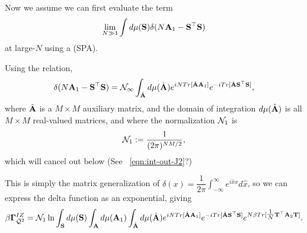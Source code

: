 Now we assume we can first evaluate the term 
\begin{align}
  \lim_{N\gg 1} \int d\mu(\mathbf{S})    \delta(N\mathbf{A}_{1}-\mathbf{S}^{\top}\mathbf{S})
\end{align}
at large-$N$ using a \SaddlePointApproximation (SPA).


Using the relation, 
\begin{align}
\delta(N\mathbf{A}_{1}-{\mathbf{S}}^{\top}{\mathbf{S}})
   =\mathcal{N_1}\int_{\hat{\mathbf{A}}}  d\mu(\hat{\mathbf{A}}) e^{ iN Tr[\hat{\mathbf{A}}\mathbf{A}_{1}] } e^{ -i Tr[\hat{\mathbf{A}}{\mathbf{S}}^{\top}{\mathbf{S}}] }  ,
\end{align}
where $\hat{\mathbf{A}}$ is a  $M \times M$ auxiliary matrix, and the domain of integration $d\mu(\hat{\mathbf{A}})$ is all $M \times M$ real-valued matrices, and where the normalization $\mathcal{N}_{1}$ is
\begin{align}
  \label{eqn:norm_1}
\mathcal{N}_1:=\frac{1}{(2\pi)^{NM/2}},
\end{align}
which will cancel out below
(See \EQN~\ref{eqn:int-out-J2}?)

This is simply the matrix generalization of 
$\delta(x)=\dfrac{1}{2\pi}\int_{-\infty}^{\infty} e^{i\hat{x}x}d\hat{x}$,
so we can express the delta function as an exponential, giving
\begin{align}
\label{eqn:Q2}
\beta\mathbf{\Gamma}^{IZ}_{\bar{\mathcal{Q}}^{2}} = \mathcal{N}_1 \ln\int_{{\mathbf{S}}}  d\mu(\mathbf{S}) \int_{\mathbf{A}} d\mu(\mathbf{A}_{1}) 
                           \int_{\hat{\mathbf{A}}} d\mu(\hat{\mathbf{A}}) e^{ iN Tr[ \hat{\mathbf{A}}\mathbf{A}_{1} ] }
                           e^{ -i Tr[ \hat{\mathbf{A}}\mathbf{S}^{\top} \mathbf{S} ] }
                           e^{  N\beta Tr[\tfrac{1}{N} {\mathbf{T}}^{\top}\mathbf{A}_{2}{\mathbf{T}} ] } .
\end{align}

